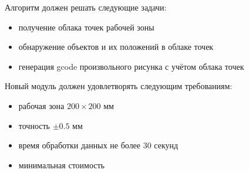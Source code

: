 Алгоритм должен решать следующие задачи:
\begin{itemize}
    \item получение облака точек рабочей зоны
    \item обнаружение объектов и их положений в облаке точек
    \item генерация gcode произвольного рисунка с учётом облака точек
\end{itemize}

Новый модуль должен удовлетворять следующим требованиям:
\begin{itemize}
    \item рабочая зона $ 200 \times 200 \text{ мм}$
    \item точность $ \pm 0.5 \text{ мм} $
    \item время обработки данных не более 30 секунд
    \item минимальная стоимость
\end{itemize}
